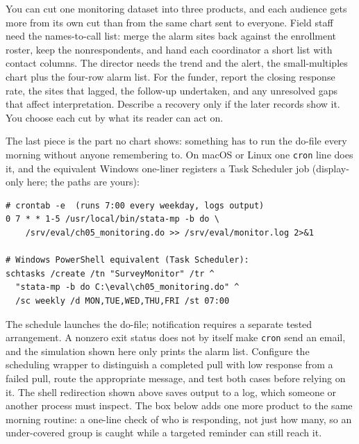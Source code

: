 You can cut one monitoring dataset into three products, and each audience gets more from its own cut than from the same chart sent to everyone. Field staff need the names-to-call list: merge the alarm sites back against the enrollment roster, keep the nonrespondents, and hand each coordinator a short list with contact columns. The director needs the trend and the alert, the small-multiples chart plus the four-row alarm list. For the funder, report the closing response rate, the sites that lagged, the follow-up undertaken, and any unresolved gaps that affect interpretation. Describe a recovery only if the later records show it. You choose each cut by what its reader can act on.

The last piece is the part no chart shows: something has to run the do-file every morning without anyone remembering to. On macOS or Linux one \texttt{cron} line does it, and the equivalent Windows one-liner registers a Task Scheduler job (display-only here; the paths are yours):
\par
{\footnotesize
\begin{verbatim}
# crontab -e  (runs 7:00 every weekday, logs output)
0 7 * * 1-5 /usr/local/bin/stata-mp -b do \
    /srv/eval/ch05_monitoring.do >> /srv/eval/monitor.log 2>&1

# Windows PowerShell equivalent (Task Scheduler):
schtasks /create /tn "SurveyMonitor" /tr ^
  "stata-mp -b do C:\eval\ch05_monitoring.do" ^
  /sc weekly /d MON,TUE,WED,THU,FRI /st 07:00
\end{verbatim}
}
The schedule launches the do-file; notification requires a separate tested arrangement. A nonzero exit status does not by itself make \texttt{cron} send an email, and the simulation shown here only prints the alarm list. Configure the scheduling wrapper to distinguish a completed pull with low response from a failed pull, route the appropriate message, and test both cases before relying on it. The shell redirection shown above saves output to a log, which someone or another process must inspect. The box below adds one more product to the same morning routine: a one-line check of who is responding, not just how many, so an under-covered group is caught while a targeted reminder can still reach it.

